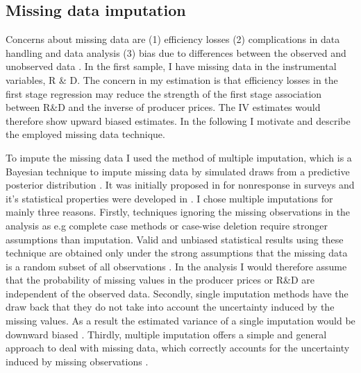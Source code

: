 \subsection{Missing data imputation}
Concerns about missing data are (1) efficiency losses (2) complications in data handling and data analysis (3) bias due to differences between the observed and unobserved data \parencite{schafer1998multiple}.
In the first sample, I have missing data in the instrumental variables, R \& D.
The concern in my estimation is that efficiency losses in the first stage regression  may reduce the strength of the first stage association between R\&D and the inverse of producer prices.
 The IV estimates would therefore show upward biased estimates.
In the following I motivate and describe the employed missing data technique.  \par
To impute the missing data I used the method of multiple imputation, which is a Bayesian technique to impute missing data by simulated draws from a predictive posterior distribution \textcite{}.
It was initially proposed in \textcite{rubin1978} for nonresponse in surveys and it's statistical properties were developed in  \textcite{Rubin1987}.
I chose multiple imputations  for mainly three reasons.
Firstly, techniques  ignoring the missing observations in the analysis as e.g complete case methods or case-wise deletion require stronger assumptions than imputation.
Valid and unbiased statistical results using these technique are obtained only under the strong assumptions that the missing data is a random subset of all observations \parencite{bhaskaran}.
In the analysis I would therefore assume that the probability of missing values in the producer prices or R\&D are independent of the observed data.
Secondly, single imputation methods have the draw back that they do not take into account the uncertainty induced by the missing values.
As a result the estimated variance of a single imputation would be downward biased \parencite{Wooldridge} .
Thirdly, multiple imputation offers a  simple and general approach to deal with missing data, which correctly accounts for the uncertainty induced by missing observations \parencite{schafer1998multiple}.
